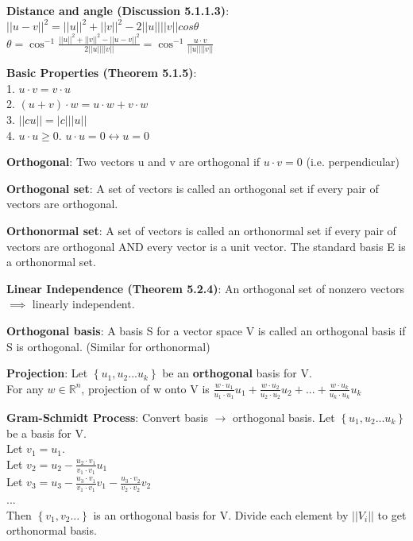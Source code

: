 \documentclass[a4paper,landscape]{article}
\newcommand{\rnname}[1]{\textbf{#1}}
\begin{document}
\begin{multicols*}{4}
\begin{flatitemize}
\item \rnname{Distance and angle (Discussion 5.1.1.3)}: $||u-v||^2 = ||u||^2 + ||v||^2 - 2 ||u|| ||v|| cos \theta$ \\
$\theta = \cos^{-1}{\frac{||u||^2 + ||v||^2 - ||u-v||^2}{2 ||u|| ||v||}} = \cos^{-1}{\frac{u \cdot v}{||u|| ||v||}}$
\item \rnname{Basic Properties (Theorem 5.1.5)}:\\
1. $ u \cdot v = v \cdot u$\\
2. $(u+v) \cdot w = u \cdot w + v \cdot w$\\
3. $||cu|| = |c| ||u||$\\
4. $u \cdot u \geq 0$. $u \cdot u = 0 \leftrightarrow u = 0$\\
\item \rnname{Orthogonal}: Two vectors u and v are orthogonal if $u \cdot v = 0$ (i.e. perpendicular)
\item \rnname{Orthogonal set}: A set of vectors is called an orthogonal set if every pair of vectors are orthogonal.
\item \rnname{Orthonormal set}: A set of vectors is called an orthonormal set if every pair of vectors are orthogonal AND every vector is a unit vector. The standard basis E is a orthonormal set.
\item \rnname{Linear Independence (Theorem 5.2.4)}: An orthogonal set of nonzero vectors $\implies$ linearly independent.
\item \rnname{Orthogonal basis}: A basis S for a vector space V is called an orthogonal basis if S is orthogonal. (Similar for orthonormal)
\item \rnname{Projection}: Let $\left\lbrace u_{1}, u_{2} ... u_{k}\right\rbrace$ be an \textbf{orthogonal} basis for V.\\
For any $w \in \mathbb{R}^n$, projection of w onto V is $\frac{w \cdot u_{1}}{u_{1}\cdot u_{1}}u_{1} + \frac{w \cdot u_{2}}{u_{2}\cdot u_{2}}u_{2} + ... + \frac{w \cdot u_{k}}{u_{k}\cdot u_{k}}u_{k}$
\item \rnname{Gram-Schmidt Process}: Convert basis $\rightarrow$ orthogonal basis. Let $\left\lbrace u_{1}, u_{2} ... u_{k}\right\rbrace$ be a basis for V. \\
Let $v_{1} = u_{1}.$\\
Let $v_{2} = u_{2} - \frac{u_{2} \cdot v_{1}}{v_{1}\cdot v_{1}}u_{1}$\\
Let $v_{3} = u_{3} - \frac{u_{3} \cdot v_{1}}{v_{1}\cdot v_{1}}v_{1} - \frac{u_{3} \cdot v_{2}}{v_{2}\cdot v_{2}}v_{2}$\\
...\\
Then $\left\lbrace v_{1}, v_{2} ...\right\rbrace$ is an orthogonal basis for V. Divide each element by $||V_{i}||$ to get orthonormal basis.


\end{flatitemize}
\end{multicols*}
\end{document}
